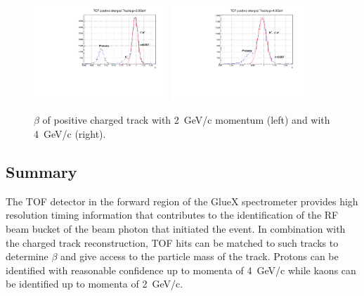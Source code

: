 \begin{figure}[tbp]
\begin{center}
\includegraphics[width=0.45\textwidth]{figures/TOF_postracks_2000mev.pdf}
\includegraphics[width=0.45\textwidth]{figures/TOF_postracks_4000mev.pdf}
\caption{\label{fig:betaproj}$\beta$ of positive charged track with 2~GeV/c momentum (left) and with 4~GeV/c (right).}
\end{center}
\end{figure}

\subsection{Summary \label{sec:scsummary}}
The TOF detector in the forward region of the GlueX spectrometer provides high resolution timing information that contributes
to the identification of the RF beam bucket of the beam photon that initiated the event. In combination with the charged
track reconstruction, TOF hits can be matched to such tracks to determine $\beta$ and give access to the particle
mass of the track. Protons can be identified with reasonable confidence up to momenta of 4~GeV/c while kaons can be
identified up to momenta of 2~GeV/c.
